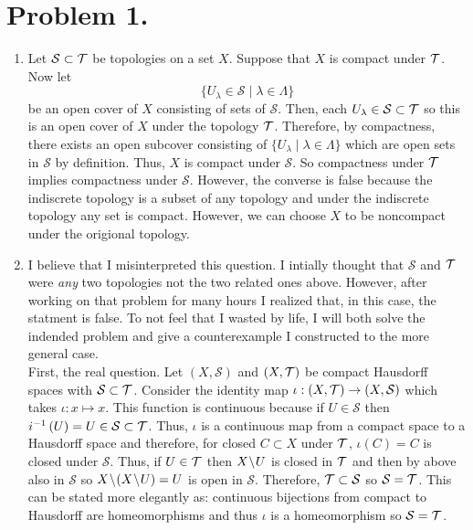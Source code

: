 \documentclass[12pt]{extarticle}
\begin{document}
 
\section*{Problem 1.}
\begin{enumerate}
\item Let $\mathcal{S} \subset \mathcal{T}$ be topologies on a set $X$. Suppose that $X$ is compact  under $\mathcal{T}$. Now let \[\{U_\lambda \in \mathcal{S} \mid \lambda \in \Lambda \}\] be an open cover of $X$ consisting of sets of $\mathcal{S}$. Then, each $U_\lambda \in \mathcal{S} \subset \mathcal{T}$ so this is an open cover of $X$ under the topology $\mathcal{T}$. Therefore, by compactness, there exists an open subcover consisting of $\{U_\lambda \mid \lambda \in \Lambda\}$ which are open sets in $\mathcal{S}$ by definition. Thus, $X$ is compact under $\mathcal{S}$. So compactness under $\mathcal{T}$ implies compactness under $\mathcal{S}$. However, the converse is false because the indiscrete topology is a subset of any topology and under the indiscrete topology any set is compact. However, we can choose $X$ to be noncompact under the origional topology.

\item I believe that I misinterpreted this question. I intially thought that $\mathcal{S}$ and $\mathcal{T}$ were \textit{any} two topologies not the two related ones above. However, after working on that problem for many hours I realized that, in this case, the statment is false. To not feel that I wasted by life, I will both solve the indended problem and give a counterexample I constructed to the more general case. \\

First, the real question. Let $(X, \mathcal{S})$ and $(X, \mathcal{T})$ be compact Hausdorff spaces with $\mathcal{S} \subset \mathcal{T}$. Consider the identity map $\iota : (X, \mathcal{T}) \to (X, \mathcal{S})$ which takes $\iota : x \mapsto x$. This function is continuous because if $U \in \mathcal{S}$ then $i^{-1} \left( U \right) = U \in \mathcal{S} \subset \mathcal{T}$. Thus, $\iota$ is a continuous map from a compact space to a Hausdorff space and therefore, for closed $C \subset X$ under $\mathcal{T}$, $\iota(C) = C$ is closed under $\mathcal{S}$. Thus, if $U \in \mathcal{T}$ then $X \! \setminus \! U$ is closed in $\mathcal{T}$ and then by above also in $\mathcal{S}$ so $X \! \setminus \! (X \! \setminus \! U) = U$ is open in $\mathcal{S}$. Therefore, $\mathcal{T} \subset \mathcal{S}$ so $\mathcal{S} = \mathcal{T}$. This can be stated more elegantly as: continuous bijections from compact to Hausdorff are homeomorphisms and thus $\iota$ is a homeomorphism so $\mathcal{S} = \mathcal{T}$.   \\


\end{enumerate}
\end{document}
